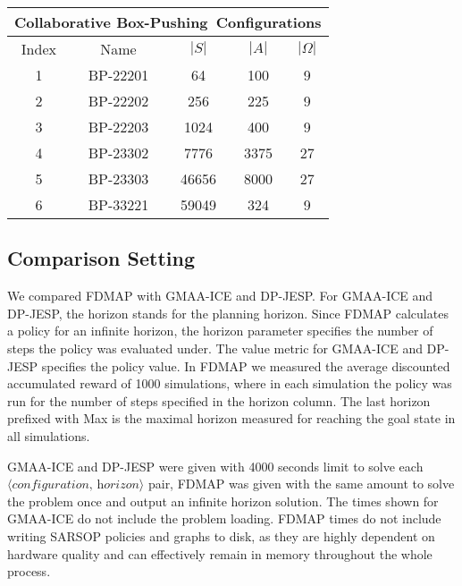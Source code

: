 \documentclass[letterpaper]{article} %
\newcommand{\eliran}[1]{\textbf{[\color{red}ELIRAN:#1]}}
\newcommand{\ronen}[1]{\textbf{[\color{blue}RONEN:#1]}}
\newcommand{\cbp}[0]{Collaborative Box-Pushing}
\begin{document}
\begin{center}
    \begin{tabular}{||c|c|c|c|c||}
         \hline
         \multicolumn{5}{||c||}{\cbp \ Configurations} \\
         \hline
         Index & Name & $|S|$ & $|A|$ & $|\Omega| $ \\ 
         \hline
         1 & BP-22201 & 64 & 100 & 9 \\
         \hline
         2 & BP-22202 & 256 & 225 & 9 \\
         \hline
         3 & BP-22203 & 1024 & 400 & 9 \\
         \hline
         4 & BP-23302 & 7776 & 3375 & 27 \\ 
         \hline
         5 & BP-23303 & 46656 & 8000 & 27 \\
         \hline
         6 & BP-33221 & 59049 & 324 & 9 \\
         \hline
    \end{tabular}
\end{center}

\subsection{Comparison Setting}
We compared FDMAP with GMAA-ICE and DP-JESP. For GMAA-ICE and DP-JESP, the horizon stands for the planning horizon. Since FDMAP calculates a policy for an infinite horizon, the horizon parameter specifies the number of steps the policy was evaluated under.
The value metric for GMAA-ICE and DP-JESP specifies the policy value. In FDMAP we measured the average discounted accumulated reward of 1000 simulations, where in each simulation the policy was run for the number of steps specified in the horizon column. The last horizon prefixed with Max is the maximal horizon measured for reaching the goal state in all simulations.

GMAA-ICE and DP-JESP were given with 4000 seconds limit to solve each $\langle\textit{configuration, horizon}\rangle$ pair, FDMAP was given with the same amount to solve the problem once and output an infinite horizon solution.
The times shown for GMAA-ICE do not include the problem loading. FDMAP times do not include writing SARSOP policies and graphs to disk, as they are highly dependent on hardware quality and can effectively remain in memory throughout the whole process.
\end{document}
